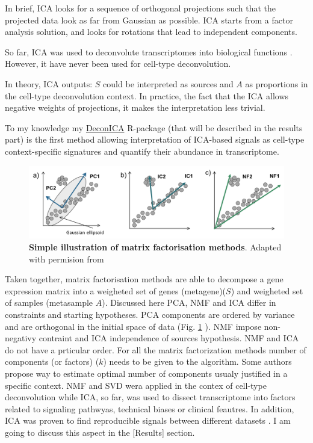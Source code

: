 \documentclass[12pt,]{book}
\theoremstyle{definition}
\theoremstyle{definition}
\theoremstyle{definition}
\theoremstyle{remark}
\begin{document}
In brief, ICA looks for a sequence of orthogonal projections such that
the projected data look as far from Gaussian as possible. ICA starts
from a factor analysis solution, and looks for rotations that lead to
independent components.

So far, ICA was used to deconvolute transcriptomes into biological
functions
\citep{Biton2014, Engreitz2010, Gorban2007, Teschendorff2007, Zinovyev2013}.
However, it have never been used for cell-type deconvolution.

In theory, ICA outputs: \(S\) could be interpreted as sources and \(A\)
as proportions in the cell-type deconvolution context. In practice, the
fact that the ICA allows negative weights of projections, it makes the
interpretation less trivial.

To my knowledge my \protect\hyperlink{DeconICA}{DeconICA} R-package
(that will be described in the results part) is the first method
allowing interpretation of ICA-based signals as cell-type
context-specific signatures and quantify their abundance in
transcriptome.

\begin{figure}

{\centering \includegraphics[width=0.8\linewidth]{figures-ext/bss} 

}

\caption[Simple illustration of matrix factorisation methods]{\textbf{Simple illustration of matrix
factorisation methods}. Adapted with permision from \citep{Zinovyev2013}}\label{fig:matrixfact}
\end{figure}




Taken together, matrix factorisation methods are able to decompose a
gene expression matrix into a weigheted set of genes (metagene)(\(S\))
and weigheted set of samples (metasample \(A\)). Discussed here PCA, NMF
and ICA differ in constraints and starting hypotheses. PCA components
are ordered by variance and are orthogonal in the initial space of data
(Fig. \ref{fig:matrixfact} ). NMF impose non-negativy contraint and ICA
independence of sources hypothesis. NMF and ICA do not have a prticular
order. For all the matrix factorization methods number of components (or
factors) (\(k\)) needs to be given to the algorithm. Some authors
propose way to estimate optimal number of components usualy justified in
a specific context. NMF and SVD wera applied in the contex of cell-type
deconvolution while ICA, so far, was used to dissect transcriptome into
factors related to signaling pathwyas, technical biases or clinical
feautres. In addition, ICA was proven to find reproducible signals
between different datasets \citep{Cantini2018, Teschendorff2007}. I am
going to discuss this aspect in the {[}Results{]} section.
\end{document}
